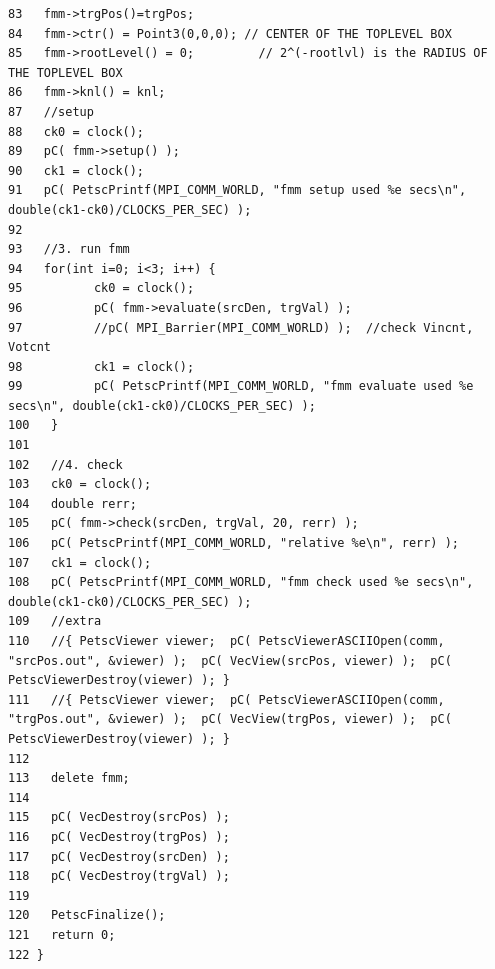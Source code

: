 \begin{verbatim}
83   fmm->trgPos()=trgPos;
84   fmm->ctr() = Point3(0,0,0); // CENTER OF THE TOPLEVEL BOX
85   fmm->rootLevel() = 0;         // 2^(-rootlvl) is the RADIUS OF THE TOPLEVEL BOX
86   fmm->knl() = knl;
87   //setup
88   ck0 = clock();
89   pC( fmm->setup() );
90   ck1 = clock();  
91   pC( PetscPrintf(MPI_COMM_WORLD, "fmm setup used %e secs\n", double(ck1-ck0)/CLOCKS_PER_SEC) );
92   
93   //3. run fmm
94   for(int i=0; i<3; i++) {
95          ck0 = clock();
96          pC( fmm->evaluate(srcDen, trgVal) );
97          //pC( MPI_Barrier(MPI_COMM_WORLD) );  //check Vincnt, Votcnt
98          ck1 = clock();
99          pC( PetscPrintf(MPI_COMM_WORLD, "fmm evaluate used %e secs\n", double(ck1-ck0)/CLOCKS_PER_SEC) );
100   }
101   
102   //4. check
103   ck0 = clock();
104   double rerr;
105   pC( fmm->check(srcDen, trgVal, 20, rerr) );
106   pC( PetscPrintf(MPI_COMM_WORLD, "relative %e\n", rerr) );
107   ck1 = clock();
108   pC( PetscPrintf(MPI_COMM_WORLD, "fmm check used %e secs\n", double(ck1-ck0)/CLOCKS_PER_SEC) );
109   //extra
110   //{ PetscViewer viewer;  pC( PetscViewerASCIIOpen(comm, "srcPos.out", &viewer) );  pC( VecView(srcPos, viewer) );  pC( PetscViewerDestroy(viewer) ); }
111   //{ PetscViewer viewer;  pC( PetscViewerASCIIOpen(comm, "trgPos.out", &viewer) );  pC( VecView(trgPos, viewer) );  pC( PetscViewerDestroy(viewer) ); }
112   
113   delete fmm;
114   
115   pC( VecDestroy(srcPos) );
116   pC( VecDestroy(trgPos) );
117   pC( VecDestroy(srcDen) );
118   pC( VecDestroy(trgVal) );
119   
120   PetscFinalize();
121   return 0;
122 }
\end{verbatim}\normalsize 


